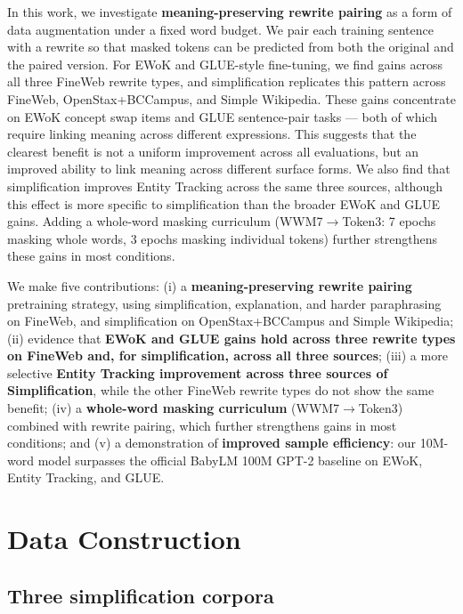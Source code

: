 \documentclass[11pt]{article}
\begin{document}
In this work, we investigate \textbf{meaning-preserving rewrite pairing} as a form of data augmentation under a fixed word budget.  We pair each training sentence with a rewrite so that masked tokens can be predicted from both the original and the paired version. For EWoK and GLUE-style fine-tuning, we find gains across all three FineWeb rewrite types, and simplification replicates this pattern across FineWeb, OpenStax+BCCampus, and Simple Wikipedia. These gains concentrate on EWoK concept swap items and GLUE sentence-pair tasks --- both of which require linking meaning across different expressions. This suggests that the clearest benefit is not a uniform improvement across all evaluations, but an improved ability to link meaning across different surface forms. We also find that simplification improves Entity Tracking across the same three sources, although this effect is more specific to simplification than the broader EWoK and GLUE gains. Adding a whole-word masking curriculum (WWM7$\to$Token3: 7 epochs masking whole words, 3 epochs masking individual tokens) further strengthens these gains in most conditions.

We make five contributions: (i) a \textbf{meaning-preserving rewrite pairing} pretraining strategy, using simplification, explanation, and harder paraphrasing on FineWeb, and simplification on OpenStax+BCCampus and Simple Wikipedia; (ii) evidence that \textbf{EWoK and GLUE gains hold across three rewrite types on FineWeb and, for simplification, across all three sources}; (iii) a more selective \textbf{Entity Tracking improvement across three sources of Simplification}, while the other FineWeb rewrite types do not show the same benefit; (iv) a \textbf{whole-word masking curriculum} (WWM7$\to$Token3) combined with rewrite pairing, which further strengthens gains in most conditions; and (v) a demonstration of \textbf{improved sample efficiency}: our 10M-word model surpasses the official BabyLM 100M GPT-2 baseline on EWoK, Entity Tracking, and GLUE.

\section{Data Construction}
\label{sec:data-construction}

\subsection{Three simplification corpora}
\label{sec:simp-corpora}
\end{document}
